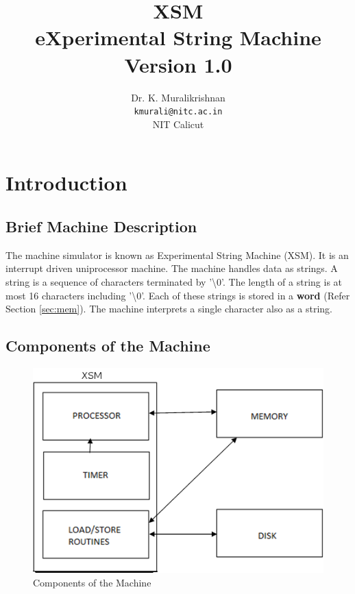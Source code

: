 \documentclass[11pt]{report}
\title{XSM \\ eXperimental String Machine \\
Version 1.0}
\author{Dr. K. Muralikrishnan  \\ \texttt{kmurali@nitc.ac.in} \\ {NIT Calicut} }
\begin{document}
\maketitle
\pagebreak

\thispagestyle{plain}

\tableofcontents
\pagebreak


\chapter{Introduction}

\section{Brief Machine Description}
The machine simulator is known as Experimental String Machine (XSM). It is an interrupt driven uniprocessor machine. The machine handles data as strings. A string is a sequence of characters terminated by '\textbackslash 0'. The length of a string is at most 16 characters including '\textbackslash 0'. Each of these strings is stored in a \textbf{word}  (Refer Section \ref{sec:mem}). The machine interprets a single character also as a string.

\section{Components of the Machine}

\begin{figure}[hbtp]
\begin{center}
\includegraphics[scale=0.5]{block.png}
\end{center}
\caption{Components of the Machine}
\end{figure}
\end{document}
